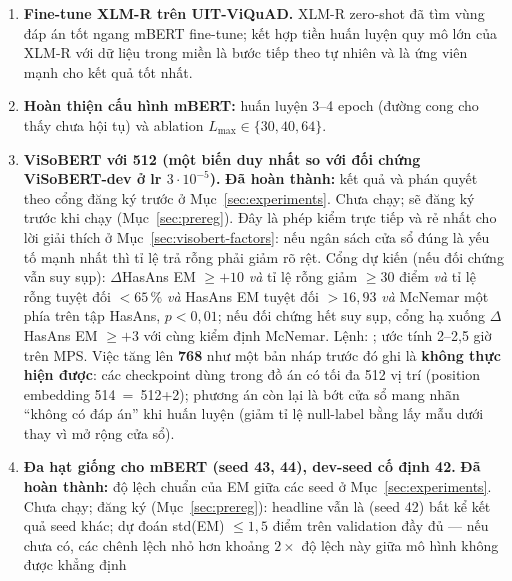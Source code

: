\begin{enumerate}
        ); ước tính 1 giờ 45 phút (mBERT) và 2 giờ (ViSoBERT) trên MPS.
        \fi
  \item \textbf{Fine-tune XLM-R trên UIT-ViQuAD.} XLM-R zero-shot đã tìm vùng đáp án tốt ngang mBERT
        fine-tune; kết hợp tiền huấn luyện quy mô lớn của XLM-R với dữ liệu trong miền là bước tiếp
        theo tự nhiên và là ứng viên mạnh cho kết quả tốt nhất.
  \item \textbf{Hoàn thiện cấu hình mBERT:} huấn luyện 3--4 epoch (đường cong cho thấy chưa hội tụ)
        và ablation $L_{\max} \in \{30, 40, 64\}$.
  \item \textbf{ViSoBERT với  512 (một biến duy nhất so với đối chứng
        ViSoBERT-dev ở lr $3\cdot10^{-5}$).}
        \ifhasVisoLong
        \textbf{Đã hoàn thành:} kết quả và phán quyết theo cổng đăng ký trước ở
        Mục~\ref{sec:experiments}.
        \else
        Chưa chạy; sẽ đăng ký trước khi chạy (Mục~\ref{sec:prereg}). Đây là phép kiểm trực tiếp và
        rẻ nhất cho lời giải thích ở Mục~\ref{sec:visobert-factors}: nếu ngân sách cửa sổ đúng là
        yếu tố mạnh nhất thì tỉ lệ trả rỗng phải giảm rõ rệt. Cổng dự kiến (nếu đối chứng vẫn suy
        sụp): $\Delta$HasAns EM $\ge {+}10$ \emph{và} tỉ lệ rỗng giảm $\ge 30$ điểm \emph{và}
        tỉ lệ rỗng tuyệt đối $< 65\,\%$ \emph{và} HasAns EM tuyệt đối $> 16{,}93$ \emph{và} McNemar
        một phía trên tập HasAns, $p < 0{,}01$; nếu đối chứng hết suy sụp, cổng hạ xuống
        $\Delta$HasAns EM $\ge {+}3$ với cùng kiểm định McNemar. Lệnh:
        ; ước tính 2--2,5 giờ trên MPS. Việc tăng
         lên \textbf{768} như một bản nháp trước đó ghi là \textbf{không thực
        hiện được}: các checkpoint dùng trong đồ án có tối đa 512 vị trí (position embedding
        514~=~512+2); phương án còn lại là bớt cửa sổ mang nhãn ``không có đáp án'' khi huấn luyện
        (giảm tỉ lệ null-label bằng lấy mẫu dưới thay vì mở rộng cửa sổ).
        \fi
  \item \textbf{Đa hạt giống cho mBERT (seed 43, 44), dev-seed cố định 42.}
        \ifhasSeeds
        \textbf{Đã hoàn thành:} độ lệch chuẩn của EM giữa các seed ở Mục~\ref{sec:experiments}.
        \else
        Chưa chạy; đăng ký (Mục~\ref{sec:prereg}): headline vẫn là  (seed 42) bất
        kể kết quả seed khác; dự đoán std(EM) $\le 1{,}5$ điểm trên validation đầy đủ --- nếu chưa
        có, các chênh lệch nhỏ hơn khoảng $2\times$ độ lệch này giữa mô hình không được khẳng định

\end{enumerate}
